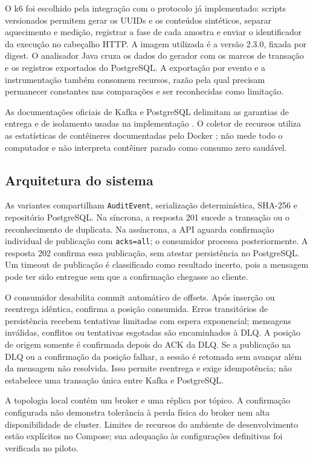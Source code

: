 O k6 foi escolhido pela integração com o protocolo já implementado: scripts versionados permitem gerar os UUIDs e os conteúdos sintéticos, separar aquecimento e medição, registrar a fase de cada amostra e enviar o identificador da execução no cabeçalho HTTP. A imagem utilizada é a versão 2.3.0, fixada por digest. O analisador Java cruza os dados do gerador com os marcos de transação e os registros exportados do PostgreSQL. A exportação por evento e a instrumentação também consomem recursos, razão pela qual precisam permanecer constantes nas comparações e ser reconhecidas como limitação.


As documentações oficiais de Kafka e PostgreSQL delimitam as garantias de entrega e de isolamento usadas na implementação \cite{kafkadocs,postgresdocs}. O coletor de recursos utiliza as estatísticas de contêineres documentadas pelo Docker \cite{dockerdocs}; não mede todo o computador e não interpreta contêiner parado como consumo zero saudável.

\subsection{Arquitetura do sistema}
As variantes compartilham \texttt{AuditEvent}, serialização determinística, SHA-256 e repositório PostgreSQL. Na síncrona, a resposta 201 sucede a transação ou o reconhecimento de duplicata. Na assíncrona, a API aguarda confirmação individual de publicação com \texttt{acks=all}; o consumidor processa posteriormente. A resposta 202 confirma essa publicação, sem atestar persistência no PostgreSQL. Um timeout de publicação é classificado como resultado incerto, pois a mensagem pode ter sido entregue sem que a confirmação chegasse ao cliente.

O consumidor desabilita commit automático de offsets. Após inserção ou reentrega idêntica, confirma a posição consumida. Erros transitórios de persistência recebem tentativas limitadas com espera exponencial; mensagens inválidas, conflitos ou tentativas esgotadas são encaminhados à DLQ. A posição de origem somente é confirmada depois do ACK da DLQ. Se a publicação na DLQ ou a confirmação da posição falhar, a sessão é retomada sem avançar além da mensagem não resolvida. Isso permite reentrega e exige idempotência; não estabelece uma transação única entre Kafka e PostgreSQL.

A topologia local contém um broker e uma réplica por tópico. A confirmação configurada não demonstra tolerância à perda física do broker nem alta disponibilidade de cluster. Limites de recursos do ambiente de desenvolvimento estão explícitos no Compose; sua adequação às configurações definitivas foi verificada no piloto.

